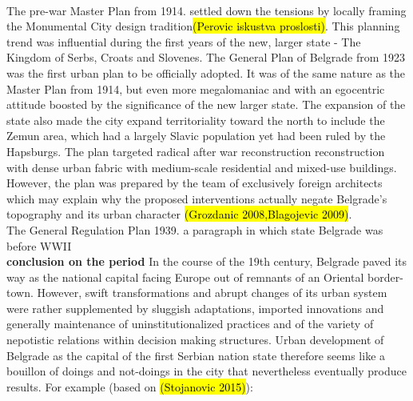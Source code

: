 \documentclass[11pt]{report}
\begin{document}
\\
The pre-war Master Plan from 1914. settled down the tensions by locally framing the Monumental City design tradition\footnotemark \hl{(Perovic iskustva proslosti)}. This planning trend was influential during the first years of the new, larger state - The Kingdom of Serbs, Croats and Slovenes. The  General  Plan  of  Belgrade  from  1923 was the first urban plan to be officially adopted. It was of the same nature as the Master Plan from 1914, but even more megalomaniac and with an egocentric attitude boosted by the significance of the new larger state. The expansion of the state also made the city expand territoriality toward the north to include the Zemun area, which had a largely Slavic population yet had been ruled by the Hapsburgs. The plan targeted radical after war reconstruction reconstruction with dense urban fabric with medium-scale residential and mixed-use buildings. However, the plan was prepared by the team of exclusively foreign architects which may explain why the proposed interventions actually negate Belgrade’s  topography  and  its  urban  character \hl{(Grozdanic 2008,Blagojevic 2009)}.
\\
The General Regulation Plan 1939.
a paragraph in which state Belgrade was before WWII
\\
\textbf{conclusion on the period}
In the course of the 19th century, Belgrade paved its way as the national capital facing Europe out of remnants of an Oriental border-town. However, swift transformations and abrupt changes of its urban system were rather supplemented by sluggish adaptations, imported innovations and generally maintenance of uninstitutionalized practices and of the variety of nepotistic relations within decision making structures. Urban development of Belgrade as the capital of the first Serbian nation state therefore seems like a bouillon of doings and not-doings in the city that nevertheless eventually produce results. For example (based on \hl{(Stojanovic 2015)}):
\end{document}

